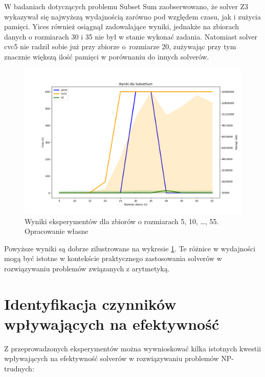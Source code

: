 W badaniach dotyczących problemu Subset Sum zaobserwowano, że solver Z3 wykazywał się najwyższą wydajnością zarówno pod względem czasu, jak i zużycia pamięci. Yices również osiągnął zadowalające wyniki, jednakże na zbiorach danych o rozmiarach 30 i 35 nie był w stanie wykonać zadania. Natomiast solver cvc5 nie radził sobie już przy zbiorze o~rozmiarze 20, zużywając przy tym znacznie większą ilość pamięci w porównaniu do innych solverów. 

\begin{figure}[htbp]
	\centering
	\begin{minipage}{\textwidth}
		\includegraphics[width=\textwidth]{./figures/8-plot.png}
		\caption{Wyniki eksperymentów dla zbiorów o rozmiarach 5, 10, \dots, 55. Opracowanie własne}
		\label{fig:8}
	\end{minipage}
\end{figure}

Powyższe wyniki są dobrze zilustrowane na wykresie \ref{fig:8}. Te różnice w wydajności mogą być istotne w kontekście praktycznego zastosowania solverów w rozwiązywaniu problemów związanych z arytmetyką.

\section{Identyfikacja czynników wpływających na efektywność}

Z przeprowadzonych eksperymentów można wywnioskować kilka istotnych kwestii wpływających na efektywność solverów w rozwiązywaniu problemów NP-trudnych:

